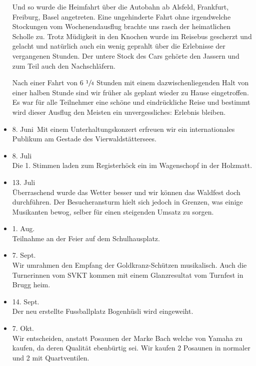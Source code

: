 \begin{history}
\begin{itemize}
              Und so wurde die Heimfahrt über die Autobahn ab Alsfeld, Frankfurt,
              Freiburg, Basel angetreten. Eine ungehinderte Fahrt ohne irgendwelche
              Stockungen vom Wochenendausflug brachte uns rasch der heimatlichen
              Scholle zu. Trotz Müdigkeit in den Knochen wurde im Reisebus gescherzt
              und gelacht und natürlich auch ein wenig geprahlt über die Erlebnisse
              der vergangenen Stunden. Der untere Stock des Cars gehörte den Jassern
              und zum Teil auch den Nachschläfern.

              Nach einer Fahrt von 6 $\sfrac{1}{4}$ Stunden mit einem
              dazwischenliegenden Halt von einer halben Stunde sind wir früher als
              geplant wieder zu Hause eingetroffen. Es war für alle Teilnehmer eine
              schöne und eindrückliche Reise und bestimmt wird dieser Ausflug den
              Meisten ein unvergessliches: Erlebnis bleiben.

        \item 8. Juni\ Mit einem Unterhaltungskonzert erfreuen wir ein
              internationales Publikum am Gestade des Vierwaldstättersees.

        \item 8. Juli\\
              Die 1. Stimmen laden zum Registerhöck ein im Wagenschopf in der
              Holzmatt.

        \item 13. Juli\\
              Überraschend wurde das Wetter besser und wir können das Waldfest doch
              durchführen. Der Besucheransturm hielt sich jedoch in Grenzen, was
              einige Musikanten bewog, selber für einen steigenden Umsatz zu sorgen.

        \item 1. Aug.\\
              Teilnahme an der Feier auf dem Schulhausplatz.

        \item 7. Sept.\\
              Wir umrahmen den Empfang der Goldkranz-Schützen musikalisch. Auch die
              Turnerinnen vom SVKT kommen mit einem Glanzresultat vom Turnfest in
              Brugg heim.

        \item 14. Sept.\\
              Der neu erstellte Fussballplatz Bogenhüsli wird eingeweiht.

        \item 7. Okt.\\
              Wir entscheiden, anstatt Posaunen der Marke Bach welche von Yamaha zu
              kaufen, da deren Qualität ebenbürtig sei. Wir kaufen 2 Posaunen in
              normaler und 2 mit Quartventilen.



    \end{itemize}

\end{history}
